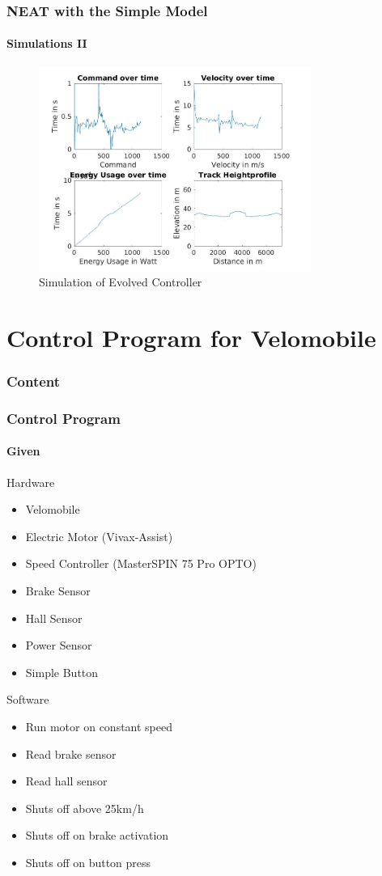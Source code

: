 \documentclass[8pt]{beamer}
\begin{document}
\begin{frame}
	\frametitle{NEAT with the Simple Model}
	\framesubtitle{Simulations II}
	\begin{figure}[hb]
  		\centering
  		\includegraphics[width=3.5in]{images/result7.jpg}
  		\caption[Simulation of Evolved Controller]
   		{Simulation of Evolved Controller}
		\end{figure}
\end{frame}


\section{Control Program for Velomobile}
\begin{frame}
	\frametitle{Content}
\end{frame}

\begin{frame}
	\frametitle{Control Program}
	\framesubtitle{Given}
	\begin{block}{Hardware}
		\begin{itemize}
			\item Velomobile
			\item Electric Motor (Vivax-Assist)
			\item Speed Controller (MasterSPIN 75 Pro OPTO)
			\item Brake Sensor
			\item Hall Sensor
			\item Power Sensor
			\item Simple Button
		\end{itemize}
	\end{block}	
	\pause
	\begin{block}{Software}
		\begin{itemize}
			\item Run motor on constant speed
			\item Read brake sensor
			\item Read hall sensor
			\item Shuts off above 25km/h
			\item Shuts off on brake activation
			\item Shuts off on button press
		\end{itemize}
	\end{block}		
\end{frame}
\end{document}
